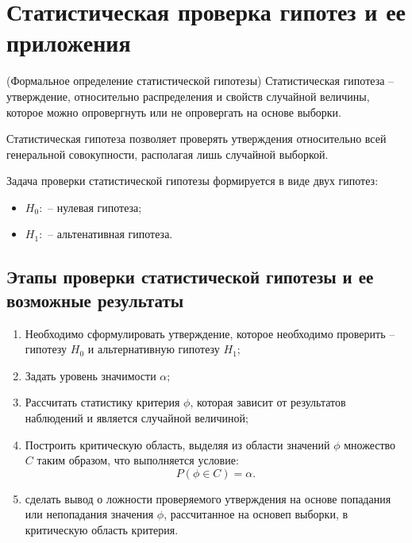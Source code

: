 \section{Статистическая проверка гипотез и ее приложения}

\begin{definition}{(Формальное определение статистической гипотезы)}{}
    Статистическая гипотеза -- утверждение, относительно распределения и свойств случайной величины, которое можно опровергнуть или не опровергать на основе выборки.
\end{definition}

\par Статистическая гипотеза позволяет проверять утверждения относительно всей генеральной совокупности, располагая лишь случайной выборкой.

\begin{note}{}{}
    Задача проверки статистической гипотезы формируется в виде двух гипотез:
    \begin{itemize}
        \item $H_0: $ -- нулевая гипотеза;
        \item $H_1: $ -- альтенативная гипотеза.
    \end{itemize}
\end{note}

\subsection*{Этапы проверки статистической гипотезы и ее возможные результаты}
\par
\begin{enumerate}
    \item Необходимо сформулировать утверждение, которое необходимо проверить -- гипотезу $H_0$ и альтернативную гипотезу $H_1$;
    \item Задать уровень значимости $\alpha$;
    \item Рассчитать статистику критерия $\phi$, которая зависит от результатов наблюдений и является случайной величиной;
    \item Построить критическую область, выделяя из области значений $\phi$ множество $C$ таким образом, что выполняется условие:
    \[
        P(\phi \in C) = \alpha.    
    \]
    \item сделать вывод о ложности проверяемого утверждения на основе попадания или непопадания значения $\phi$, рассчитанное на основеп выборки, в критическую область критерия.
\end{enumerate}

